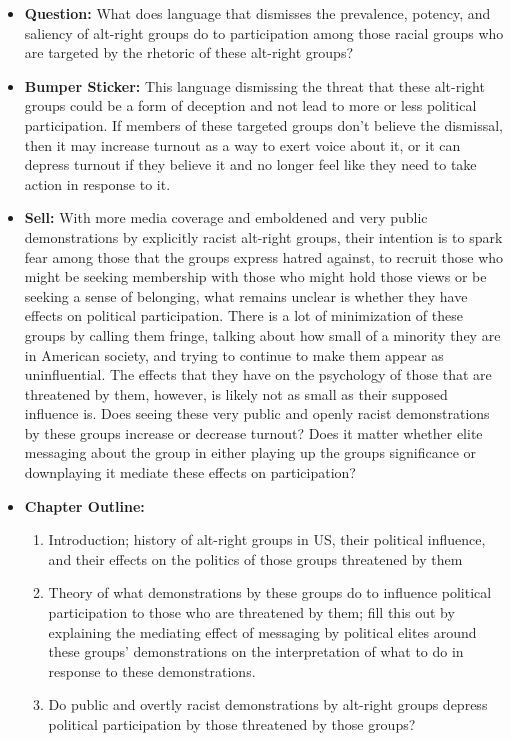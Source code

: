 \documentclass[12pt]{article}
\begin{document}
    \begin{itemize}
        \item \textbf{Question:} What does language that dismisses the prevalence, potency, and saliency of alt-right groups do to participation among those racial groups who are targeted by the rhetoric of these alt-right groups?
        \item \textbf{Bumper Sticker:} This language dismissing the threat that these alt-right groups could be a form of deception and not lead to more or less political participation. If members of these targeted groups don't believe the dismissal, then it may increase turnout as a way to exert voice about it, or it can depress turnout if they believe it and no longer feel like they need to take action in response to it.
        \item \textbf{Sell:} With more media coverage and emboldened and very public demonstrations by explicitly racist alt-right groups, their intention is to spark fear among those that the groups express hatred against, to recruit those who might be seeking membership with those who might hold those views or be seeking a sense of belonging, what remains unclear is whether they have effects on political participation. There is a lot of minimization of these groups by calling them fringe, talking about how small of a minority they are in American society, and trying to continue to make them appear as uninfluential. The effects that they have on the psychology of those that are threatened by them, however, is likely not as small as their supposed influence is. Does seeing these very public and openly racist demonstrations by these groups increase or decrease turnout? Does it matter whether elite messaging about the group in either playing up the groups significance or downplaying it mediate these effects on participation?
        \item \textbf{Chapter Outline:}
        \begin{enumerate}
            \item Introduction; history of alt-right groups in US, their political influence, and their effects on the politics of those groups threatened by them
            \item Theory of what demonstrations by these groups do to influence political participation to those who are threatened by them; fill this out by explaining the mediating effect of messaging by political elites around these groups' demonstrations on the interpretation of what to do in response to these demonstrations.
            \item Do public and overtly racist demonstrations by alt-right groups depress political participation by those threatened by those groups?

\end{enumerate}
\end{itemize}
\end{document}
